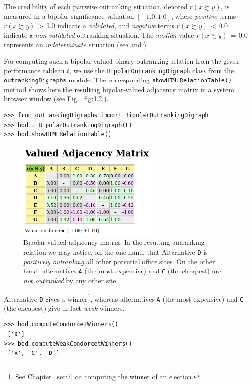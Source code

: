 The credibility of each pairwise outranking situation, denoted $r(x \succsim y)$, is measured in a bipolar significance valuation $[-1.0, 1.0]$, where \emph{positive} terms $r(x \succsim y)\, >\, 0.0$ indicate a \emph{validated}, and \emph{negative} terms $r(x \succsim y)\, <\, 0.0$ indicate a \emph{non-validated} outranking situation. The \emph{median} value $r(x \succsim y)\, = \,0.0$ represents an \emph{indeterminate} situation (see \citealp{BIS-2004a} and \citealp{BIS-2013}).   

For computing such a bipolar-valued binary outranking relation from the given performance tableau $t$, we use the \texttt{BipolarOutrankingDigraph} class from the \texttt{outrankingDigraphs} module. The corresponding
\texttt{showHTMLRe\-lation\-Table()} method shows here the resulting bipolar-valued adjacency matrix in a system browser window (see Fig.~\vref{fig:4.2}).
\begin{lstlisting}[caption={Computing a bipolar-valued outranking digraph},label=list:4.3]
>>> from outrankingDigraphs import BipolarOutrankingDigraph
>>> bod = BipolarOutrankingDigraph(t)
>>> bod.showHTMLRelationTable()
\end{lstlisting}
\begin{figure}[ht]
\sidecaption[t]
\includegraphics[width=7cm]{Figures/4-2-officeChoiceOutranking.png}
\caption{Bipolar-valued adjacency matrix. In the resulting outranking relation we may notice, on the one hand, that Alternative \texttt{D} is \emph{positively outranking} all other potential office sites. On the other hand, alternatives \texttt{A} (the most expensive) and \texttt{C} (the cheapest) are \emph{not outranked} by any other site}
\label{fig:4.2}       %
\end{figure}

Alternative \texttt{D} gives a \Condorcet winner\footnote{See Chapter~\ref{sec:7} on computing the winner of an election.}, whereas alternatives \texttt{A} (the most expensive) and \texttt{C} (the cheapest) give in fact \emph{weak} \Condorcet winners.
\begin{lstlisting}
>>> bod.computeCondorcetWinners()
 ['D']
>>> bod.computeWeakCondorcetWinners()
 ['A', 'C', 'D']
\end{lstlisting}


